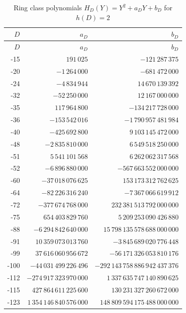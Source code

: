 \documentclass[11pt,a4paper]{amsart} %
\theoremstyle{definition}
\begin{document}
\begingroup
\scriptsize
\setlength{\tabcolsep}{4pt}
\begin{longtable}{@{}r r r@{}}
\caption{Ring class polynomials \(H_D(Y)=Y^2+a_DY+b_D\) for \(h(D)=2\)}
\label{tab:h2poly}\\
\toprule
\(D\)&\(a_D\)&\(b_D\)\\
\midrule
\endfirsthead
\toprule
\(D\)&\(a_D\)&\(b_D\)\\
\midrule
\endhead
-15 & \(191\,025\) & \(-121\,287\,375\) \\
-20 & \(-1\,264\,000\) & \(-681\,472\,000\) \\
-24 & \(-4\,834\,944\) & \(14\,670\,139\,392\) \\
-32 & \(-52\,250\,000\) & \(12\,167\,000\,000\) \\
-35 & \(117\,964\,800\) & \(-134\,217\,728\,000\) \\
-36 & \(-153\,542\,016\) & \(-1\,790\,957\,481\,984\) \\
-40 & \(-425\,692\,800\) & \(9\,103\,145\,472\,000\) \\
-48 & \(-2\,835\,810\,000\) & \(6\,549\,518\,250\,000\) \\
-51 & \(5\,541\,101\,568\) & \(6\,262\,062\,317\,568\) \\
-52 & \(-6\,896\,880\,000\) & \(-567\,663\,552\,000\,000\) \\
-60 & \(-37\,018\,076\,625\) & \(153\,173\,312\,762\,625\) \\
-64 & \(-82\,226\,316\,240\) & \(-7\,367\,066\,619\,912\) \\
-72 & \(-377\,674\,768\,000\) & \(232\,381\,513\,792\,000\,000\) \\
-75 & \(654\,403\,829\,760\) & \(5\,209\,253\,090\,426\,880\) \\
-88 & \(-6\,294\,842\,640\,000\) & \(15\,798\,135\,578\,688\,000\,000\) \\
-91 & \(10\,359\,073\,013\,760\) & \(-3\,845\,689\,020\,776\,448\) \\
-99 & \(37\,616\,060\,956\,672\) & \(-56\,171\,326\,053\,810\,176\) \\
-100 & \(-44\,031\,499\,226\,496\) & \(-292\,143\,758\,886\,942\,437\,376\) \\
-112 & \(-274\,917\,323\,970\,000\) & \(1\,337\,635\,747\,140\,890\,625\) \\
-115 & \(427\,864\,611\,225\,600\) & \(130\,231\,327\,260\,672\,000\) \\
-123 & \(1\,354\,146\,840\,576\,000\) & \(148\,809\,594\,175\,488\,000\,000\) \\

\end{longtable}
\end{document}
